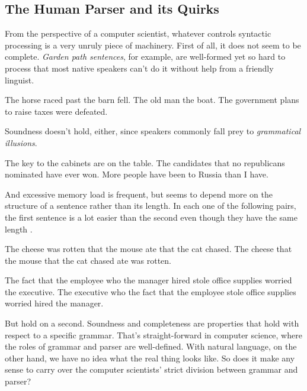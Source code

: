 \subsection{The Human Parser and its Quirks}
\label{sub:BigPicture_HumanParser}
From the perspective of a computer scientist, whatever controls syntactic processing is a very unruly piece of machinery.
First of all, it does not seem to be complete. 
\emph{Garden path sentences}, for example, are well-formed yet so hard to process that most native speakers can't do it without help from a friendly linguist.
%
\begin{exe}
    \ex
    \begin{xlist}
        \ex The horse raced past the barn fell.
        \ex The old man the boat.
        \ex The government plans to raise taxes were defeated.
    \end{xlist}
\end{exe}
%
Soundness doesn't hold, either, since speakers commonly fall prey to \emph{grammatical illusions}.
%
\begin{exe}
    \ex
    \begin{xlist}
        \ex The key to the cabinets are on the table.
        \ex The candidates that no republicans nominated have ever won.
        \ex More people have been to Russia than I have.
    \end{xlist}
\end{exe}
%
And excessive memory load is frequent, but seems to depend more on the structure of a sentence rather than its length.
In each one of the following pairs, the first sentence is a lot easier than the second even though they have the same length \citep[cf.][]{Gibson98, Resnik92}.
%
\begin{exe}
    \ex
    \begin{xlist}
        \ex The cheese was rotten that the mouse ate that the cat chased. 
        \ex The cheese that the mouse that the cat chased ate was rotten.
    \end{xlist}
    \ex
    \begin{xlist}
        \ex The fact that the employee who the manager hired stole office supplies worried the executive.
        \ex The executive who the fact that the employee stole office supplies worried hired the manager.
    \end{xlist}
\end{exe}

But hold on a second.
Soundness and completeness are properties that hold with respect to a specific grammar.
That's straight-forward in computer science, where the roles of grammar and parser are well-defined.
With natural language, on the other hand, we have no idea what the real thing looks like.
So does it make any sense to carry over the computer scientists' strict division between grammar and parser?

